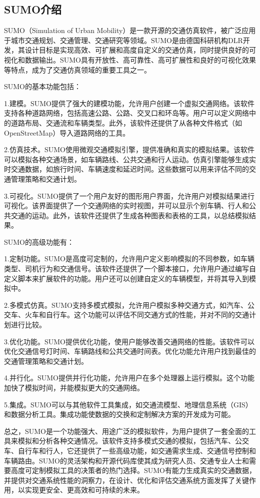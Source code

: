 \subsection{SUMO介绍}

SUMO（Simulation of Urban Mobility）是一款开源的交通仿真软件，被广泛应用于城市交通规划、交通管理、交通研究等领域。SUMO是由德国科研机构DLR开发，其设计目标是实现高效、可扩展和高度自定义的交通仿真，同时提供良好的可视化和数据输出。SUMO具有开放性、高可靠性、高可扩展性和良好的可视化效果等特点，成为了交通仿真领域的重要工具之一。

SUMO的基本功能包括：

1.建模。SUMO提供了强大的建模功能，允许用户创建一个虚拟交通网络。该软件支持各种道路网络，包括高速公路、公路、交叉口和环岛等。用户可以定义网络中的道路布局、交通流和车辆类型。此外，该软件还提供了从各种文件格式（如OpenStreetMap）导入道路网络的工具。

2.仿真技术。SUMO使用微观交通模拟引擎，提供准确和真实的模拟结果。该软件可以模拟各种交通场景，如车辆路线、公共交通和行人运动。仿真引擎能够生成实时交通数据，如旅行时间、车辆速度和延迟时间。这些数据可以用来评估不同的交通管理策略和交通计划。

3.可视化。SUMO提供了一个用户友好的图形用户界面，允许用户对模拟结果进行可视化。该界面提供了一个交通网络的实时视图，并可以显示个别车辆、行人和公共交通的运动。此外，该软件还提供了生成各种图表和表格的工具，以总结模拟结果。

SUMO的高级功能有：

1.定制功能。SUMO是高度可定制的，允许用户定义影响模拟的不同参数，如车辆类型、司机行为和交通信号。该软件还提供了一个脚本接口，允许用户通过编写自定义脚本来扩展软件的功能。用户还可以创建自定义的车辆模型，并将其导入到模拟中。

2.多模式仿真。SUMO支持多模式模拟，允许用户模拟多种交通方式，如汽车、公交车、火车和自行车。这个功能可以评估不同交通方式的性能，并对不同的交通计划进行比较。

3.优化功能。SUMO提供优化功能，使用户能够改善交通网络的性能。该软件可以优化交通信号灯时间、车辆路线和公共交通时间表。优化功能允许用户找到最佳的交通管理策略和交通计划。

4.并行化。SUMO提供并行化功能，允许用户在多个处理器上运行模拟。这个功能加快了模拟时间，并能模拟更大的交通网络。

5.集成。SUMO可以与其他软件工具集成，如交通流模型、地理信息系统（GIS）和数据分析工具。集成功能使数据的交换和定制解决方案的开发成为可能。

总之，SUMO是一个功能强大、用途广泛的模拟软件，为用户提供了一套全面的工具来模拟和分析各种交通情况。该软件支持多模式交通的模拟，包括汽车、公交车、自行车和行人，它还提供了一些高级功能，如交通需求生成、交通信号控制和车辆路由。SUMO的灵活架构和开源代码库使其成为研究人员、交通专业人士和需要高度可定制模拟工具的决策者的热门选择。SUMO有能力生成真实的交通数据，并提供对交通系统性能的洞察力，在设计、优化和评估交通系统方面发挥了关键作用，以实现更安全、更高效和可持续的未来。

